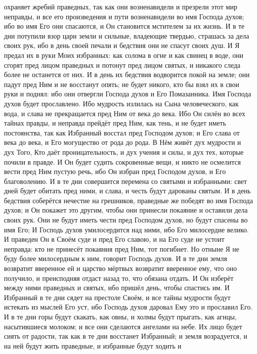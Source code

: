 охраняет жребий праведных, так как они возненавидели и презрели этот мир
неправды, и все его произведения и пути возненавидели во имя Господа духов; ибо
во имя Его они спасаются, и Он становится мстителем за их жизнь.
И в те дни потупили взор цари земли и сильные, владеющие твердью,
страшась за дела своих рук, ибо в день своей печали и бедствия они не спасут
своих душ.
И Я предал их в руки Моих избранных: как солома в огне и как свинец в
воде, они сгорят пред лицом праведных и потонут пред лицом святых, и никакого
следа более не останется от них.
И в день их бедствия водворится покой на земле; они падут пред Ним и
не восстанут опять; не будет никого, кто бы взял их в свои руки и поднял: ибо
они отвергли Господа духов и Его Помазанника.
Имя Господа духов будет прославлено.
Ибо мудрость излилась на Сына человеческого, как вода, и слава не
прекращается пред Ним от века до века.
Ибо Он силён во всех тайнах правды, и неправда прейдёт пред Ним, как
тень, и не будет иметь постоянства, так как Избранный восстал пред Господом
духов; и Его слава от века до века, и Его могущество от рода до рода.
В Нём живёт дух мудрости и дух Того, Кто даёт проницательность, и дух
учения и силы, и дух тех, которые почили в правде.
И Он будет судить сокровенные вещи, и никто не осмелится вести пред
Ним пустую речь, ибо Он избран пред Господом духов, и Его благоволению.
И в те дни совершится перемена со святыми и избранными: свет дней
будет обитать пред ними, и слава, и честь будут дарованы святым.
И в день бедствия соберётся нечестие на грешников, праведные же
победят во имя Господа духов; и Он покажет это другим, чтобы они принесли
покаяние и оставили дела своих рук.
Они не будут иметь чести пред Господом духов, но будут спасены во имя
Его; И Господь духов умилосердится над ними, ибо Его милосердие велико.
И праведен Он в Своём суде и пред Его славою, и на Его суде не устоит
неправда: кто не принесёт покаяния пред Ним, тот погибнет.
Но отныне Я не буду более милосердным к ним, говорит Господь духов.
И в те дни земля возвратит вверенное ей и царство мёртвых
возвратит вверенное ему, что оно получило, и преисподняя отдаст назад то, что
обязана отдать.
И Он изберёт между ними праведных и святых, ибо пришёл день, чтобы
спастись им.
И Избранный в те дни сядет на престоле Своём, и все тайны мудрости
будут истекать из мыслей Его уст, ибо Господь духов даровал Ему это и прославил
Его.
И в те дни горы будут скакать, как овны, и холмы будут прыгать, как
агнцы, насытившиеся молоком; и все они сделаются ангелами на небе.
Их лицо будет сиять от радости, так как в те дни восстанет Избранный;
и земля возрадуется, и на ней будут жить праведные, и избранные будут ходить и
